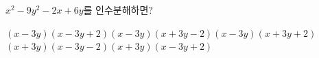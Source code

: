 $x^2-9y^2-2x+6y$를 인수분해하면?
\begin{choicesii}{$(x-3y)(x-3y+2)$}{$(x-3y)(x+3y-2)$}{$(x-3y)(x+3y+2)$}{$(x+3y)(x-3y-2)$}{$(x+3y)(x-3y+2)$}\end{choicesii}
